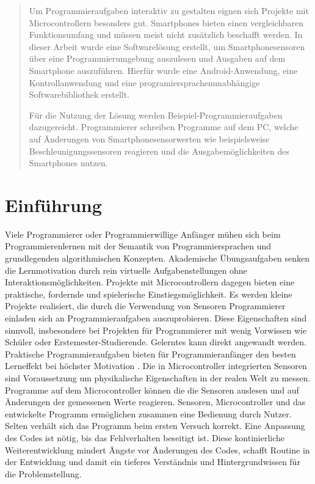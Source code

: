 \documentclass[11pt,a4paper]{report}
\begin{document}

\begin{abstract}
Um Programmieraufgaben interaktiv zu gestalten eignen sich Projekte mit Microcontrollern besonders gut.
Smartphones bieten einen vergleichbaren Funktionsumfang und müssen meist nicht zusätzlich beschafft werden.
In dieser Arbeit wurde eine Softwarelösung erstellt, um Smartphonesensoren über eine Programmierumgebung auszulesen und Ausgaben auf dem Smartphone auszuführen.
Hierfür wurde eine Android-Anwendung, eine Kontrollanwendung und eine programiersprachenunabhängige Softwarebibliothek erstellt.

Für die Nutzung der Lösung werden Beispiel-Programmieraufgaben dazugereicht.
Programmierer schreiben Programme auf dem PC, welche auf Änderungen von Smartphonesensorwerten wie beispielsweise Beschleunigungssensoren reagieren und die Ausgabemöglichkeiten des Smartphones nutzen.
\end{abstract}

\tableofcontents

\chapter{Einführung} \label{chap:intro}
Viele Programmierer oder Programmierwillige Anfänger mühen sich beim Programmierenlernen mit der Semantik von Programmiersprachen und grundlegenden algorithmischen Konzepten.
Akademische Übungsaufgaben senken die Lernmotivation durch rein virtuelle Aufgabenstellungen ohne Interaktionsmöglichkeiten.
Projekte mit Microcontrollern dagegen bieten eine praktische, fordernde und spielerische Einstiegsmöglichkeit.
Es werden kleine Projekte realisiert, die durch die Verwendung von Sensoren Programmierer einladen sich an Programmieraufgaben auszuprobieren.
Diese Eigenschaften sind sinnvoll, insbesondere bei Projekten für Programmierer mit wenig Vorwissen wie Schüler oder Erstemester-Studierende.
Gelerntes kann direkt angewandt werden.
Praktische Programmieraufgaben bieten für Programmieranfänger den besten Lerneffekt bei höchster Motivation \cite{learning_computer_programming}.
Die in Microcontroller integrierten Sensoren sind Voraussetzung um physikalische Eigenschaften in der realen Welt zu messen.
Programme auf dem Microcontroller können die die Sensoren auslesen und auf Änderungen der gemessenen Werte reagieren.
Sensoren, Microcontroller und das entwickelte Programm ermöglichen zusammen eine Bedienung durch Nutzer.
Selten verhält sich das Programm beim ersten Versuch korrekt.
Eine Anpassung des Codes ist nötig, bis das Fehlverhalten beseitigt ist.
Diese kontinierliche Weiterentwicklung mindert Ängste vor Änderungen des Codes, schafft Routine in der Entwicklung und damit ein tieferes Verständnis und Hintergrundwissen für die Problemstellung.
\end{document}
